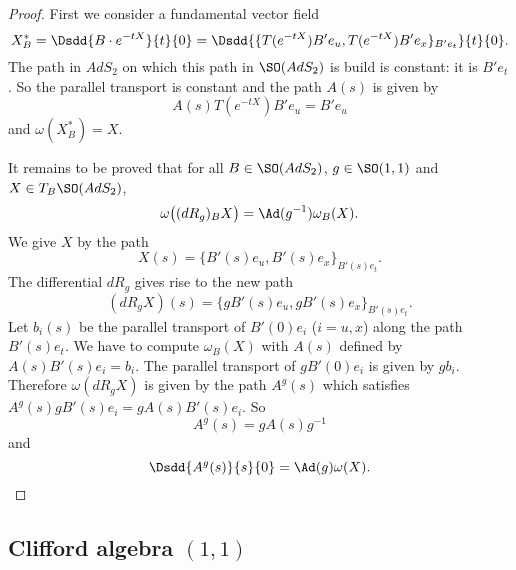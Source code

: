 \begin{proof}
	First we consider a fundamental vector field
	\[
		X^*_B=\Dsdd{ B\cdot e^{-tX} }{t}{0}=\Dsdd{ \{ T( e^{-tX})B'e_u,T( e^{-tX})B'e_x \}_{B'e_t} }{t}{0}.
	\]
	The path in $AdS_2$ on which this path in $\SO(AdS_2)$ is build is constant: it is $B'e_t$. So the parallel transport is constant and the path $A(s)$ is given by
	\[
		A(s)T( e^{-tX})B'e_u=B'e_u
	\]
	and $\omega(X^*_B)=X$.

	It remains to be proved that for all $B\in \SO(AdS_2)$, $g\in \SO(1,1)$ and $X\in T_B\SO(AdS_2)$,
	\begin{equation}
		\omega\big( (dR_g)_BX \big)=\Ad(g^{-1})\omega_B(X).
	\end{equation}
	We give $X$ by the path
	\[
		X(s)=\{ B'(s)e_u,B'(s)e_x \}_{B'(s)e_t}.
	\]
	The differential $dR_g$ gives rise to the new path
	\[
		(dR_gX)(s)=\{ gB'(s)e_u,gB'(s)e_x \}_{B'(s)e_t}.
	\]
	Let $b_i(s)$ be the parallel transport of $B'(0)e_i$ ($i=u,x$) along the path $B'(s)e_t$. We have to compute $\omega_B(X)$ with $A(s)$ defined by $A(s)B'(s)e_i=b_i$. The parallel transport of $gB'(0)e_i$ is given by $gb_i$. Therefore $\omega(dR_gX)$ is given by the path $A^g(s)$ which satisfies $A^g(s)gB'(s)e_i=gA(s)B'(s)e_i$. So
	\[
		A^g(s)=gA(s)g^{-1}
	\]
	and
	\[
		\Dsdd{ A^g(s) }{s}{0}=\Ad(g)\omega(X).
	\]

\end{proof}

\subsection{Clifford algebra \texorpdfstring{$(1,1)$}{(1,1)}}

